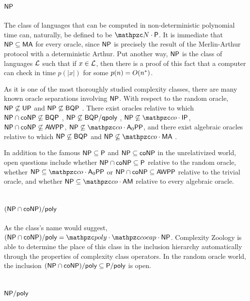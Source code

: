 \subsection{$\mathsf{NP}$}

The class of languages that can be computed in non-deterministic polynomial time
can, naturally, be defined to be $\cN\cdot\sP$. It is immediate that 
$\mathsf{NP}\subseteq\mathsf{MA}$ for every oracle, since $\mathsf{NP}$ is precisely the result of 
the Merlin-Arthur protocol with a deterministic Arthur. Put another way, $\mathsf{NP}$ 
is the class of languages $\mathcal{L}$ such that if $x\in\mathcal{L}$, then there is a proof of
this fact that a computer can check in time $p(|x|)$ for some $p(n)=O(n^*)$.

As it is one of the most thoroughly studied complexity classes, there are many 
known oracle separations involving $\mathsf{NP}$. With respect to the random oracle, 
$\mathsf{NP}\not\subseteq\mathsf{UP}$ \cite{beigel1989relativized} and 
$\mathsf{NP}\not\subseteq\mathsf{BQP}$ \cite{bennett1997strengths}. There exist oracles 
relative to which $\mathsf{NP}\cap\mathsf{co}\mathsf{NP}\not\subseteq\mathsf{BQP}$ 
\cite{bennett1997strengths}, $\mathsf{NP}\not\subseteq\mathsf{BQP}/\mathsf{qpoly}$ 
\cite{aaronson2004limitations}, $\NP\not\subseteq\cco\cdot\msf{IP}$, 
$\mathsf{NP}\cap\mathsf{co}\mathsf{NP}\not\subseteq\mathsf{AWPP}$, 
$\NP\not\subseteq\cco\cdot\msf{A}_0\msf{PP}$, and there exist algebraic oracles 
relative to which $\mathsf{NP}\not\subseteq\mathsf{BQP}$ and 
$\NP\not\subseteq\cco\cdot\msf{MA}$ \cite{aaronson2009algebrization}.

In addition to the famous $\mathsf{NP}\subseteq\mathsf{P}$ and $\mathsf{NP}\subseteq\mathsf{co}\mathsf{NP}$ in the 
unrelativized world, open questions include whether $\mathsf{NP}\cap\mathsf{co}\mathsf{NP}\subseteq\mathsf{P}$ 
relative to the random oracle, whether $\NP\subseteq\cco\cdot\msf{A}_0\msf{PP}$ 
or $\mathsf{NP}\cap\mathsf{co}\mathsf{NP}\subseteq\mathsf{AWPP}$ relative to the trivial oracle, and 
whether $\NP\subseteq\cco\cdot\msf{AM}$ relative to every algebraic oracle.

\subsection{$(\mathsf{NP}\cap\mathsf{co}\mathsf{NP})/\mathsf{poly}$}

As the class's name would suggest, 
$(\NP\cap\co\NP)/\poly=\cpoly\cdot\cocap\cdot\NP$. Complexity Zoology is able to 
determine the place of this class in the inclusion hierarchy automatically 
through the properties of complexity class operators. In the random oracle 
world, the inclusion $(\mathsf{NP}\cap\mathsf{co}\mathsf{NP})/\mathsf{poly}\subseteq\mathsf{P}/\mathsf{poly}$ is open.

\subsection{$\mathsf{NP}/\mathsf{poly}$}

